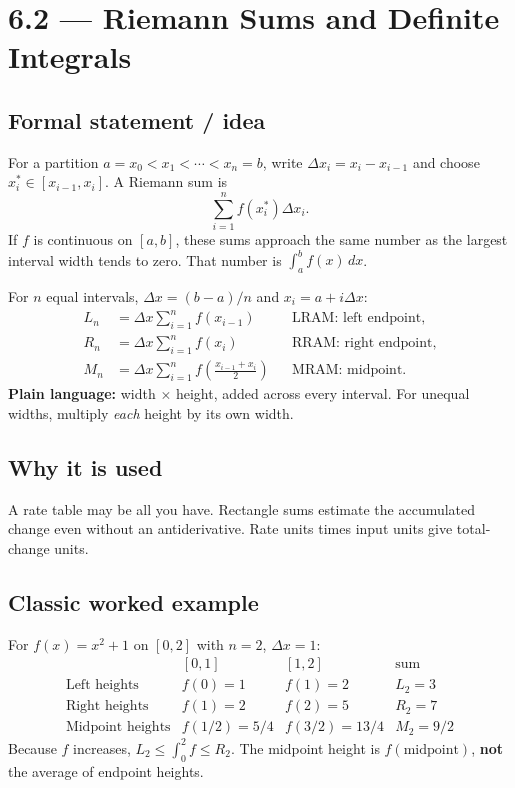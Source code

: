 \documentclass[11pt]{article}
\newcommand{\topic}[2]{\clearpage\section*{#1 --- #2}}
\newcommand{\dx}{\,dx}
\begin{document}
\topic{6.2}{Riemann Sums and Definite Integrals}
\subsection*{Formal statement / idea}
For a partition $a=x_0<x_1<\cdots<x_n=b$, write $\Delta x_i=x_i-x_{i-1}$ and choose $x_i^*\in[x_{i-1},x_i]$. A Riemann sum is
\[
\sum_{i=1}^n f(x_i^*)\Delta x_i.
\]
If $f$ is continuous on $[a,b]$, these sums approach the same number as the largest interval width tends to zero. That number is $\int_a^b f(x)\dx$.

For $n$ equal intervals, $\Delta x=(b-a)/n$ and $x_i=a+i\Delta x$:
\begin{align*}
L_n&=\Delta x\sum_{i=1}^n f(x_{i-1}) &&\text{LRAM: left endpoint},\\
R_n&=\Delta x\sum_{i=1}^n f(x_i) &&\text{RRAM: right endpoint},\\
M_n&=\Delta x\sum_{i=1}^n f\left(\frac{x_{i-1}+x_i}{2}\right)
&&\text{MRAM: midpoint}.
\end{align*}
\textbf{Plain language:} width $\times$ height, added across every interval. For unequal widths, multiply \emph{each} height by its own width.

\subsection*{Why it is used}
A rate table may be all you have. Rectangle sums estimate the accumulated change even without an antiderivative. Rate units times input units give total-change units.

\subsection*{Classic worked example}
For $f(x)=x^2+1$ on $[0,2]$ with $n=2$, $\Delta x=1$:
\[
\begin{array}{c|cc|c}
&[0,1]&[1,2]&\text{sum}\\ \hline
\text{Left heights}&f(0)=1&f(1)=2&L_2=3\\
\text{Right heights}&f(1)=2&f(2)=5&R_2=7\\
\text{Midpoint heights}&f(1/2)=5/4&f(3/2)=13/4&M_2=9/2
\end{array}
\]
Because $f$ increases, $L_2\le\int_0^2f\le R_2$. The midpoint height is $f(\text{midpoint})$, \textbf{not} the average of endpoint heights.
\end{document}
